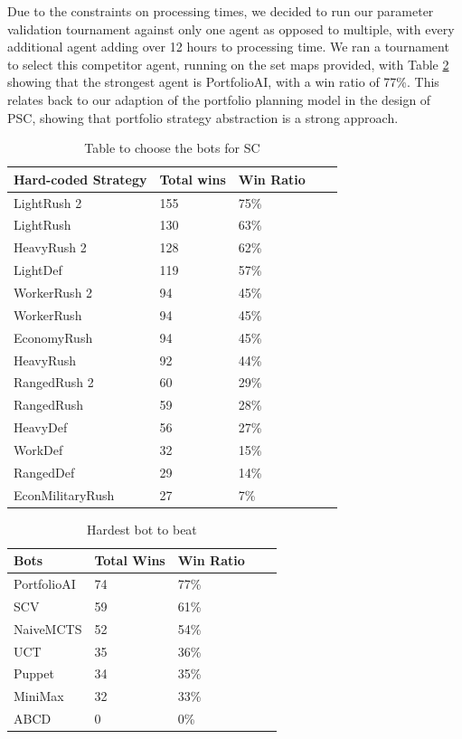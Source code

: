 \documentclass[]{article}
\begin{document}
Due to the constraints on processing times, we decided to run our parameter validation tournament against only one agent as opposed to multiple, with every additional agent adding over 12 hours to processing time. We ran a tournament to select this competitor agent, running on the set maps provided, with 
Table \ref{table:bestbot} showing that the strongest agent is PortfolioAI, with a win ratio of 77\%. This relates back to our adaption of the portfolio planning model in the design of PSC, showing that portfolio strategy abstraction is a strong approach. 

\begin{table}[]
\caption{Table to choose the bots for SC}
\begin{tabular}{lllll}
\hline
Hard-coded Strategy                & Total wins & Win Ratio   \\ \midrule
LightRush 2          & 155        &  75\%  \\
LightRush         & 130        &  63\%  \\
HeavyRush 2      & 128        &   62\% \\
LightDef          & 119        &  57\%  \\
WorkerRush 2      & 94         &  45\% \\
WorkerRush        & 94         &  45\%  \\
EconomyRush       & 94         &   45\%   \\
HeavyRush         & 92         &   44\%   \\
RangedRush 2      & 60         &   29\%  \\
RangedRush        & 59         &   28\%   \\
HeavyDef          & 56         &    27\%  \\
WorkDef           & 32         &   15\%  \\
RangedDef         & 29         &   14\%   \\
EconMilitaryRush & 27         &  7\%  \\ 
\bottomrule
\end{tabular}
\label{table:choosebotsforSC}
\end{table}


\begin{table}[]
\caption{Hardest bot to beat}
\begin{tabular}{lllll}
\toprule
Bots      & Total Wins & Win Ratio \\ \midrule
PortfolioAI & 74 & 77\%                  \\
SCV       & 59 & 61\%                  \\
NaiveMCTS & 52 & 54\%                  \\
UCT       & 35 & 36\%                  \\
Puppet    & 34 & 35\%                  \\
MiniMax   & 32 & 33\%                  \\
ABCD      & 0  & 0\%                  \\
 \bottomrule
\end{tabular}
\label{table:bestbot}
\end{table}
\end{document}
